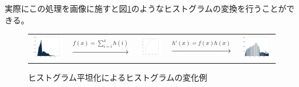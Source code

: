 \documentclass[a4paper,11pt,dvipdfmx]{jsarticle}
\begin{document}
実際にこの処理を画像に施すと図\ref{hist_3}のようなヒストグラムの変換を行うことができる。

\begin{figure}[htbp]
    \centering
    \begin{tabular}{ccccc}
    \begin{minipage}[l]{0.2\hsize}
        \centering
        \includegraphics[width=40mm]{./img/flatten_ex.jpg}
    \end{minipage}&
    \begin{minipage}[c]{0.2\hsize}
        \centering
        \begin{math}
                \overset{f(x) = \sum_{i=i}^{x}h(i)}{\to}
        \end{math}
    \end{minipage}&
    \begin{minipage}[c]{0.21\hsize}
        \centering
        \includegraphics[width=30mm]{./img/flatten_func_ex.jpg}
    \end{minipage}&
    \begin{minipage}{0.12\hsize}
        \centering
        \begin{math}
                \overset{h'(x)=f(x)h(x)}{\to}
        \end{math}
    \end{minipage}&
    \begin{minipage}[c]{0.2\hsize}
        \centering
        \includegraphics[width=40mm]{./img/flatten_ex2.jpg}
    \end{minipage}
    \end{tabular}
    \caption{ヒストグラム平坦化によるヒストグラムの変化例}
    \label{hist_3}
\end{figure}
\end{document}
